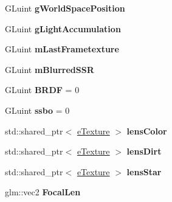 \begin{DoxyCompactItemize}
\item 
G\+Luint {\bfseries g\+World\+Space\+Position}\hypertarget{class_post_process_ae41ec5a53a774012cd1208cd27ba3f3b}{}\label{class_post_process_ae41ec5a53a774012cd1208cd27ba3f3b}

\item 
G\+Luint {\bfseries g\+Light\+Accumulation}\hypertarget{class_post_process_a9ec31d85453885addcb4f2ef1314cd38}{}\label{class_post_process_a9ec31d85453885addcb4f2ef1314cd38}

\item 
G\+Luint {\bfseries m\+Last\+Frametexture}\hypertarget{class_post_process_a067b6f0c72c87a1933ca49d802fbe66f}{}\label{class_post_process_a067b6f0c72c87a1933ca49d802fbe66f}

\item 
G\+Luint {\bfseries m\+Blurred\+S\+SR}\hypertarget{class_post_process_ac08d956c85be818c5c6b23ecaa51f6ab}{}\label{class_post_process_ac08d956c85be818c5c6b23ecaa51f6ab}

\item 
G\+Luint {\bfseries B\+R\+DF} = 0\hypertarget{class_post_process_adb16998b4029278936a3f58f02c3fd94}{}\label{class_post_process_adb16998b4029278936a3f58f02c3fd94}

\item 
G\+Luint {\bfseries ssbo} = 0\hypertarget{class_post_process_a2a196884f22cec1c846cee570f0a8228}{}\label{class_post_process_a2a196884f22cec1c846cee570f0a8228}

\item 
std\+::shared\+\_\+ptr$<$ \hyperlink{classe_texture}{e\+Texture} $>$ {\bfseries lens\+Color}\hypertarget{class_post_process_a62018a688ecd4f43129cb155db3d3fc9}{}\label{class_post_process_a62018a688ecd4f43129cb155db3d3fc9}

\item 
std\+::shared\+\_\+ptr$<$ \hyperlink{classe_texture}{e\+Texture} $>$ {\bfseries lens\+Dirt}\hypertarget{class_post_process_af42dc428972b5293b4c9a0d96a5e8076}{}\label{class_post_process_af42dc428972b5293b4c9a0d96a5e8076}

\item 
std\+::shared\+\_\+ptr$<$ \hyperlink{classe_texture}{e\+Texture} $>$ {\bfseries lens\+Star}\hypertarget{class_post_process_ab326c2e2f17955ca2cb48f04151b3b39}{}\label{class_post_process_ab326c2e2f17955ca2cb48f04151b3b39}

\item 
glm\+::vec2 {\bfseries Focal\+Len}\hypertarget{class_post_process_a3ed78039bfa461aae333a58993c60d50}{}\label{class_post_process_a3ed78039bfa461aae333a58993c60d50}


\end{DoxyCompactItemize}
